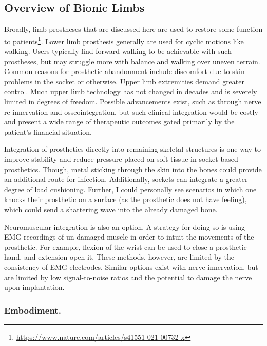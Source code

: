 \subsection{Overview of Bionic Limbs}

Broadly, limb prostheses that are discussed here are used to restore some function to patients\footnote{\url{https://www.nature.com/articles/s41551-021-00732-x}}. Lower limb prosthesis generally are used for cyclic motions like walking. Users typically find forward walking to be achievable with such prostheses, but may struggle more with balance and walking over uneven terrain. Common reasons for prosthetic abandonment include discomfort due to skin problems in the socket or otherwise. Upper limb extremities demand greater control. Much upper limb technology has not changed in decades and is severely limited in degrees of freedom. Possible advancements exist, such as through nerve re-innervation and osseointegration, but such clinical integration would be costly and present a wide range of therapeutic outcomes gated primarily by the patient's financial situation.\newline

Integration of prosthetics directly into remaining skeletal structures is one way to improve stability and reduce pressure placed on soft tissue in socket-based prosthetics. Though, metal sticking through the skin into the bones could provide an additional route for infection. Additionally, sockets can integrate a greater degree of load cushioning. Further, I could personally see scenarios in which one knocks their prosthetic on a surface (as the prosthetic does not have feeling), which could send a shattering wave into the already damaged bone. \newline

Neuromuscular integration is also an option. A strategy for doing so is using EMG recordings of un-damaged muscle in order to intuit the movements of the prosthetic. For example, flexion of the wrist can be used to close a prosthetic hand, and extension open it. These methods, however, are limited by the consistency of EMG electrodes. Similar options exist with nerve innervation, but are limited by low signal-to-noise ratios and the potential to damage the nerve upon implantation.

\subsubsection{Embodiment.}

